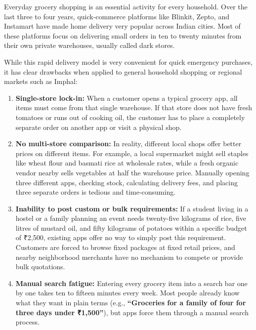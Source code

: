 
Everyday grocery shopping is an essential activity for every household. Over the last three to four years, quick-commerce platforms like Blinkit, Zepto, and Instamart have made home delivery very popular across Indian cities. Most of these platforms focus on delivering small orders in ten to twenty minutes from their own private warehouses, usually called dark stores. 

While this rapid delivery model is very convenient for quick emergency purchases, it has clear drawbacks when applied to general household shopping or regional markets such as Imphal:
\begin{enumerate}
    \item \textbf{Single-store lock-in:} When a customer opens a typical grocery app, all items must come from that single warehouse. If that store does not have fresh tomatoes or runs out of cooking oil, the customer has to place a completely separate order on another app or visit a physical shop.
    \item \textbf{No multi-store comparison:} In reality, different local shops offer better prices on different items. For example, a local supermarket might sell staples like wheat flour and basmati rice at wholesale rates, while a fresh organic vendor nearby sells vegetables at half the warehouse price. Manually opening three different apps, checking stock, calculating delivery fees, and placing three separate orders is tedious and time-consuming.
    \item \textbf{Inability to post custom or bulk requirements:} If a student living in a hostel or a family planning an event needs twenty-five kilograms of rice, five litres of mustard oil, and fifty kilograms of potatoes within a specific budget of ₹2,500, existing apps offer no way to simply post this requirement. Customers are forced to browse fixed packages at fixed retail prices, and nearby neighborhood merchants have no mechanism to compete or provide bulk quotations.
    \item \textbf{Manual search fatigue:} Entering every grocery item into a search bar one by one takes ten to fifteen minutes every week. Most people already know what they want in plain terms (e.g., \textbf{``Groceries for a family of four for three days under ₹1,500''}), but apps force them through a manual search process.
\end{enumerate}

